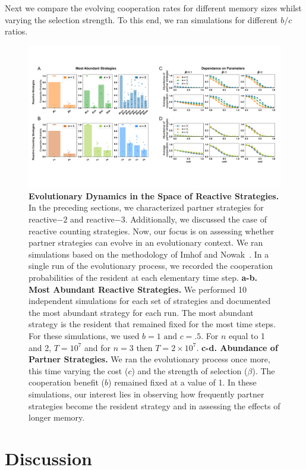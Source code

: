 \documentclass{article}
\theoremstyle{definition}
\begin{document}
Next we compare the evolving cooperation rates for different memory sizes whilst
varying the selection strength. To this end, we ran simulations for different
$b/c$ ratios.

\begin{figure}[htbp]
  \centering
  \includegraphics[width=\textwidth]{figures/evolutionary_results.pdf}
  \caption{\textbf{Evolutionary Dynamics in the Space of Reactive Strategies.}
  In the preceding sections, we characterized partner strategies for reactive$-2$
  and reactive$-3$. Additionally, we discussed the case of reactive counting
  strategies. Now, our focus is on assessing whether partner strategies can evolve
  in an evolutionary context. We ran simulations based on the methodology of Imhof
  and Nowak~\cite{imhof:royal:2010}. In a single run of the evolutionary process,
  we recorded the cooperation probabilities of the resident at each elementary
  time step.
  \textbf{a-b. Most Abundant Reactive Strategies.} We performed 10 independent
  simulations for each set of strategies and documented the most abundant strategy
  for each run. The most abundant strategy is the resident that remained fixed for
  the most time steps. For these simulations, we used \(b=1 \text{ and } c=.5\).
  For $n$ equal to 1 and 2, \(T= 10 ^ 7\) and for $n=3$ then \(T= 2 \times10 ^
  7\).
  \textbf{c-d. Abundance of Partner Strategies.}
  We ran the evolutionary process once more, this time varying the cost ($c$) and
  the strength of selection ($\beta$). The cooperation benefit ($b$) remained
  fixed at a value of 1. In these simulations, our interest lies in observing how
  frequently partner strategies become the resident strategy and in assessing the
  effects of longer memory.}\label{fig:evolutionary_results}
\end{figure}


\section{Discussion}

~\\

\end{document}
